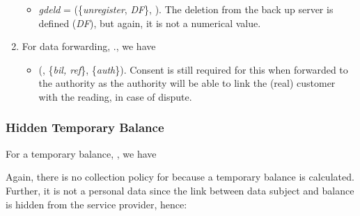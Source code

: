 \documentclass[a4paper]{article}
\begin{document}
\begin{enumerate}
\begin{itemize}
\item \textit{gdeld} = (\{\textit{unregister}, \textit{DF}\}, ).     The deletion from the back up server is defined (\textit{DF}), but again, it is not a numerical value.  
\end{itemize}   

\item For data forwarding, ., we have  

\begin{itemize}
\item (, \{\textit{bil, ref}\}, \{\textit{auth}\}). Consent is still required for this when forwarded to the authority as the authority will be able to link the (real) customer with the reading, in case of dispute.    
\end{itemize}   

\end{enumerate} 


\subsubsection{Hidden Temporary Balance} 
For a temporary balance, , we have 

\begin{center}
\noindent\fbox{\parbox{6.7cm}{\ \ \ \ \ \ \ \ \   (, , , )     
     }
}
\end{center} 

Again, there is no collection policy for  because a temporary balance is calculated. Further, it is not a personal data since the link between data subject and balance is hidden from the service provider, hence: 
\end{document}
